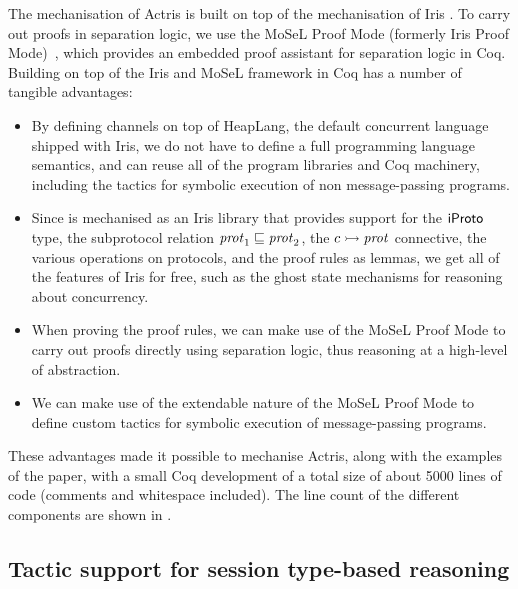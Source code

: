 The mechanisation of Actris is built on top of the mechanisation of Iris
\cite{krebbers-ESOP2017,jung-ICFP06,jung-JFP2018}.
To carry out proofs in separation logic, we use the MoSeL Proof Mode
(formerly Iris Proof Mode)~\cite{krebbers-POPL2017,krebbers-PACMPL2018}, which
provides an embedded proof assistant for separation logic in Coq.
Building \lname on top of the Iris and MoSeL framework in Coq has a number of tangible
advantages:
\begin{itemize}
\item By defining channels on top of HeapLang, the default concurrent language
  shipped with Iris, we do not have to define a full programming language
  semantics, and can reuse all of the program libraries and Coq machinery,
  including the tactics for symbolic execution of non message-passing programs.
\item Since \lname is mechanised as an Iris library that provides
  support for the $\mathsf{iProto}$ type, the subprotocol relation
  $\mathit{prot}_1 \sqsubseteq \mathit{prot}_2$, the $c \rightarrowtail \mathit{prot}$ connective, the
  various operations on protocols, and the proof rules as lemmas, we get all
  of the features of Iris for free,
  such as the ghost state mechanisms for reasoning about concurrency.
\item When proving the \lname proof rules, we can make use of the MoSeL Proof
  Mode to carry out proofs directly using separation logic, thus reasoning at
  a high-level of abstraction.
\item We can make use of the extendable nature of the MoSeL Proof Mode to
  define custom tactics for symbolic execution of message-passing programs.
\end{itemize}
These advantages made it possible to mechanise Actris, along with the examples of
the paper, with a small Coq development of a
total size of about 5000 lines of code (comments and whitespace included).
The line count of the different components are shown in .
\coqfig

\subsection{Tactic support for session type-based reasoning}
\label{sec:coq_prog_proof}

